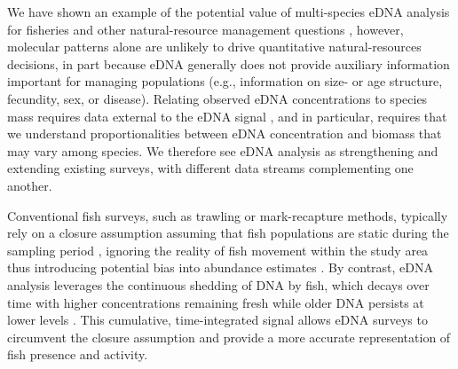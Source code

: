\documentclass{article}
\begin{document}
We have shown an example of the potential value of multi-species eDNA analysis for fisheries and other natural-resource management questions \cite{ledger2024,stoeckle2024}, however, molecular patterns alone are unlikely to drive quantitative natural-resources decisions, in part because eDNA generally does not provide auxiliary information important for managing populations (e.g., information on size- or age structure, fecundity, sex, or disease). Relating observed eDNA concentrations to species mass requires data external to the eDNA signal \cite{guri2024a}, and in particular, requires that we understand proportionalities between eDNA concentration and biomass that may vary among species. We therefore see eDNA analysis as strengthening and extending existing surveys, with different data streams complementing one another. 


Conventional fish surveys, such as trawling or mark-recapture methods, typically rely on a closure assumption assuming that fish populations are static during the sampling period \cite{bailey2014}, ignoring the reality of fish movement within the study area thus introducing potential bias into abundance estimates \cite{rota2009}. By contrast, eDNA analysis leverages the continuous shedding of DNA by fish, which decays over time with higher concentrations remaining fresh while older DNA persists at lower levels \cite{thomsen2015,jerde2011}. This cumulative, time-integrated signal allows eDNA surveys to circumvent the closure assumption and provide a more accurate representation of fish presence and activity.




\end{document}
